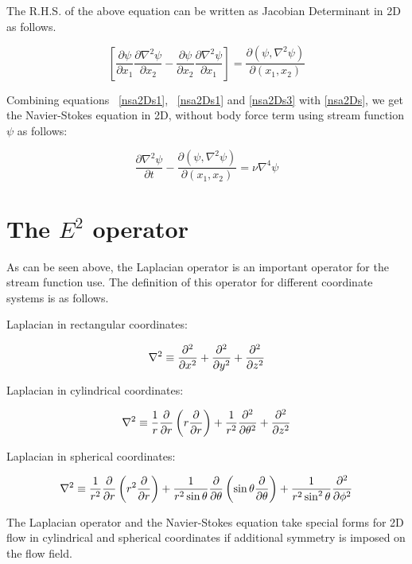 The R.H.S. of the above equation can be written as Jacobian Determinant in 2D as follows.

\begin{equation}
\label{nsa2Ds3}
\left[ \frac{\partial \psi}{\partial x_1} \frac{\partial \nabla^2 \psi}{\partial x_2} - \frac{\partial \psi}{\partial x_2} \frac{\partial \nabla^2 \psi}{\partial x_1} \right] = \frac{\partial \left( \psi, \nabla^2 \psi\right)}{\partial\left(x_1, x_2\right)}
\end{equation}

Combining equations ~\ref{nsa2Ds1}, ~\ref{nsa2Ds1} and \ref{nsa2Ds3} with \ref{nsa2Ds}, we get the Navier-Stokes equation in 2D, without body force term using stream function $\psi$ as follows:

\begin{equation}
\label{nsa2Ds4}
\boxed{
\frac{\partial \nabla^2 \psi}{\partial t} -  \frac{\partial \left( \psi, \nabla^2 \psi\right)}{\partial\left(x_1, x_2\right)} = \nu \nabla^4 \psi
}
\end{equation}


\section{The $E^2$ operator}

As can be seen above, the Laplacian operator is an important operator for the stream function use. The definition of this operator for different coordinate systems is as follows.


Laplacian in rectangular coordinates:

$$ \nabla^2 \equiv {\partial^2 \over \partial x^2} + {\partial^2 \over \partial y^2} + {\partial^2 \over \partial z^2} $$


Laplacian in cylindrical coordinates:

$$ \nabla^2 \equiv {1 \over r} {\partial \over \partial r} \left( r {\partial \over \partial r} \right) + {1 \over r^2} {\partial^2 \over \partial \theta^2} + {\partial^2 \over \partial z^2} $$


Laplacian in spherical coordinates:

$$ \nabla^2 \equiv {1 \over r^2} {\partial \over \partial r} \left( r^2 {\partial \over \partial r} \right) + {1 \over r^2 \sin\theta} {\partial \over \partial \theta} \left( \sin \theta {\partial \over \partial \theta } \right) + {1 \over r^2 \sin^2\theta} {\partial^2 \over \partial \phi^2} $$

The Laplacian operator and the Navier-Stokes equation take special forms for 2D flow in cylindrical and spherical coordinates if additional symmetry is imposed on the flow field.


